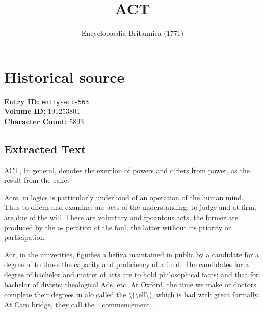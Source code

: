 \documentclass{article}
\title{ACT}
\date{Encyclopaedia Britannica (1771)}
\begin{document}
\maketitle

\section*{Historical source}
\textbf{Entry ID:} \texttt{entry-act-563} \\
\textbf{Volume ID:} 191253801 \\
\textbf{Character Count:} 5893

\subsection*{Extracted Text}
ACT, in general, denotes the exertion of powers and differs from power, as the result from the caife.

Acrs, in logics is particularly underhood of an operation of the human mind. Thus to difern and examine, are acts of the understanding; to judge and at firm, are due of the will. There are voluntary and fpoantous acts, the former are produced by the o- peration of the foul, the latter without its priority or participation.

Acr, in the univerities, figuifies a hefixa maintained in public by a candidate for a degree of to those the capacity and proficiency of a fluid. The candidates for a degree of bachelor and matter of arts are to hold philosophical facts; and that for bachelor of divists; theological Ads, etc. At Oxford, the time we make or doctors complete their degrees in alo called the \textbackslash{}(\textbackslash{}ell\textbackslash{}), which is bad with great formally. At Cam bridge, they call the \_commencement\_.
\end{document}
